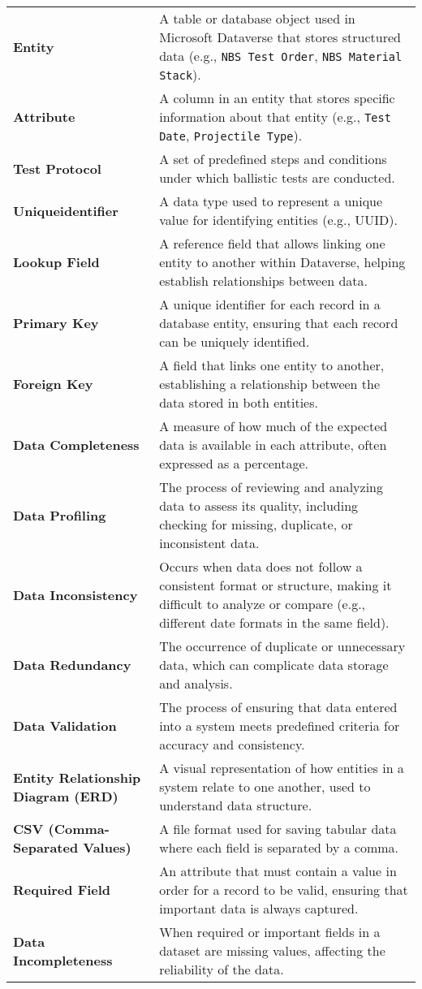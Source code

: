 \begin{small}
\begin{longtable}{m{5cm} | m{9cm}}
        \textbf{Entity} & A table or database object used in Microsoft Dataverse that stores structured data (e.g., \texttt{NBS Test Order}, \texttt{NBS Material Stack}). \\[2em]
        \textbf{Attribute} & A column in an entity that stores specific information about that entity (e.g., \texttt{Test Date}, \texttt{Projectile Type}). \\[2em]
        \textbf{Test Protocol} & A set of predefined steps and conditions under which ballistic tests are conducted. \\[2em]
        \textbf{Uniqueidentifier} & A data type used to represent a unique value for identifying entities (e.g., UUID). \\[2em]
        \textbf{Lookup Field} & A reference field that allows linking one entity to another within Dataverse, helping establish relationships between data. \\[2em]
        \textbf{Primary Key} & A unique identifier for each record in a database entity, ensuring that each record can be uniquely identified. \\[2em]
        \textbf{Foreign Key} & A field that links one entity to another, establishing a relationship between the data stored in both entities. \\[2em]
        \textbf{Data Completeness} & A measure of how much of the expected data is available in each attribute, often expressed as a percentage. \\[2em]
        \textbf{Data Profiling} & The process of reviewing and analyzing data to assess its quality, including checking for missing, duplicate, or inconsistent data. \\[2em]
        \textbf{Data Inconsistency} & Occurs when data does not follow a consistent format or structure, making it difficult to analyze or compare (e.g., different date formats in the same field). \\[2em]
        \textbf{Data Redundancy} & The occurrence of duplicate or unnecessary data, which can complicate data storage and analysis. \\[2em]
        \textbf{Data Validation} & The process of ensuring that data entered into a system meets predefined criteria for accuracy and consistency. \\[2em]
        \textbf{Entity Relationship Diagram (ERD)} & A visual representation of how entities in a system relate to one another, used to understand data structure. \\[2em]
        \textbf{CSV (Comma-Separated Values)} & A file format used for saving tabular data where each field is separated by a comma. \\[2em]
        \textbf{Required Field} & An attribute that must contain a value in order for a record to be valid, ensuring that important data is always captured. \\[2em]
        \textbf{Data Incompleteness} & When required or important fields in a dataset are missing values, affecting the reliability of the data. \\[2em]
    \end{longtable}
\end{small}